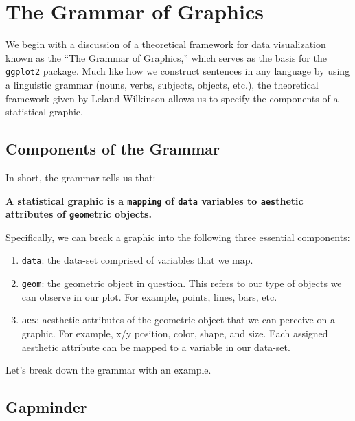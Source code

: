 \documentclass[12pt,]{krantz}
\providecommand{\tightlist}{%
  \setlength{\itemsep}{0pt}\setlength{\parskip}{0pt}}
\renewenvironment{quote}{\begin{VF}}{\end{VF}}
\theoremstyle{definition}
\theoremstyle{definition}
\theoremstyle{definition}
\theoremstyle{remark}
\begin{document}
\section{The Grammar of Graphics}\label{grammarofgraphics}

We begin with a discussion of a theoretical framework for data
visualization known as the ``The Grammar of Graphics,'' which serves as
the basis for the \texttt{ggplot2} package. Much like how we construct
sentences in any language by using a linguistic grammar (nouns, verbs,
subjects, objects, etc.), the theoretical framework given by Leland
Wilkinson \citep{wilkinson2005} allows us to specify the components of a
statistical graphic.

\subsection{Components of the Grammar}\label{components-of-the-grammar}

In short, the grammar tells us that:

\begin{quote}
\textbf{A statistical graphic is a \texttt{mapping} of \texttt{data}
variables to \texttt{aes}thetic attributes of \texttt{geom}etric
objects.}
\end{quote}

Specifically, we can break a graphic into the following three essential
components:

\begin{enumerate}
\def\labelenumi{\arabic{enumi}.}
\tightlist
\item
  \texttt{data}: the data-set comprised of variables that we map.
\item
  \texttt{geom}: the geometric object in question. This refers to our
  type of objects we can observe in our plot. For example, points,
  lines, bars, etc.
\item
  \texttt{aes}: aesthetic attributes of the geometric object that we can
  perceive on a graphic. For example, x/y position, color, shape, and
  size. Each assigned aesthetic attribute can be mapped to a variable in
  our data-set.
\end{enumerate}

Let's break down the grammar with an example.

\subsection{Gapminder}\label{gapminder}
\end{document}
